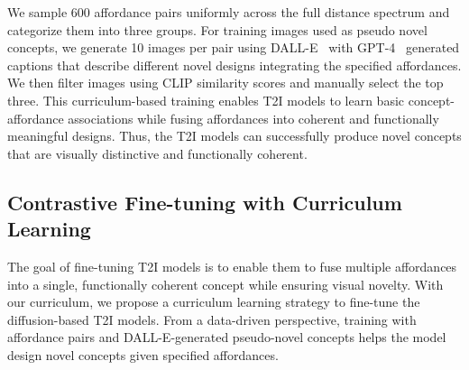 We sample 600 affordance pairs uniformly across the full distance spectrum and categorize them into three groups. For training images used as pseudo novel concepts, we generate 10 images per pair using DALL-E~\cite{ramesh2021zeroshottexttoimagegeneration} with GPT-4~\citep{openai2024gpt4ocard} generated captions that describe different novel designs integrating the specified affordances. We then filter images using CLIP similarity scores and manually select the top three. This curriculum-based training enables T2I models to learn basic concept-affordance associations while fusing affordances into coherent and functionally meaningful designs. Thus, the T2I models can successfully produce novel concepts that are visually distinctive and functionally coherent. 


\subsection{Contrastive Fine-tuning with Curriculum Learning}
\label{sec:ft}
The goal of fine-tuning T2I models is to enable them to fuse multiple affordances into a single, functionally coherent concept while ensuring visual novelty. With our curriculum, we propose a curriculum learning strategy to fine-tune the diffusion-based T2I models. From a data-driven perspective, training with affordance pairs and DALL-E-generated pseudo-novel concepts helps the model design novel concepts given specified affordances.

